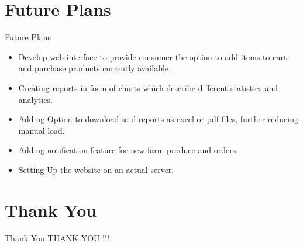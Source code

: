 \documentclass[10pt, a4paper]{beamer}
\begin{document}
\section{Future Plans}
\begin{frame}{Future Plans}
    \begin{itemize}
        \item Develop web interface to provide consumer the option to add items to cart and purchase products currently available.
        \item Creating reports in form of charts which describe different statistics and analytics.
        \item Adding Option to download said reports as excel or pdf files, further reducing manual load.
        \item Adding notification feature for new farm produce and orders.
        \item Setting Up the website on an actual server.
    \end{itemize}
\end{frame}


\section{Thank You}
\begin{frame}{Thank You}
    \centering THANK YOU !!!
\end{frame}
\end{document}
